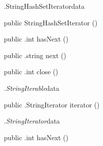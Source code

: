\begin{CrexxClass}{.StringHashSetIterator}{data}

  \begin{Hierarchy}
  \end{Hierarchy}

  \begin{Members}

    \Factory
      {public}
      {StringHashSetIterator}
      {()}

    \Method
      {public}
      {.int}
      {hasNext}
      {()}

    \Method
      {public}
      {.string}
      {next}
      {()}

    \Method
      {public}
      {.int}
      {close}
      {()}

  \end{Members}
\end{CrexxClass}

\begin{CrexxClass}{\textit{.StringIterable}}{data}

  \begin{Hierarchy}
  \end{Hierarchy}

  \begin{Members}

    \Method
      {public}
      {.StringIterator}
      {iterator}
      {()}

  \end{Members}
\end{CrexxClass}

\begin{CrexxClass}{\textit{.StringIterator}}{data}

  \begin{Hierarchy}
  \end{Hierarchy}

  \begin{Members}

    \Method
      {public}
      {.int}
      {hasNext}
      {()}

  \end{Members}
\end{CrexxClass}

